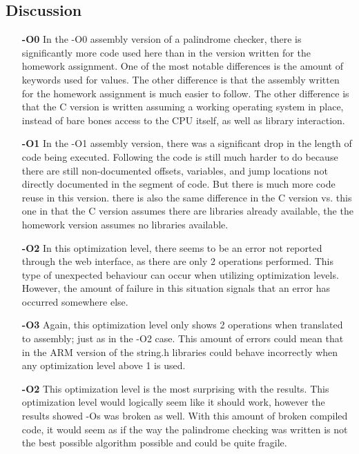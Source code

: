 \documentclass[letterpaper,10pt,titlepage]{article}
\begin{document}
\subsection*{Discussion}
\begin{enumerate}
\item[\textbf{-O0}]{}
In the -O0 assembly version of a palindrome checker, there is significantly more code used here than in the version written for the homework assignment. One of the most notable differences is the amount of keywords used for values. The other difference is that the assembly written for the homework assignment is much easier to follow. The other difference is that the C version is written assuming a working operating system in place, instead of bare bones access to the CPU itself, as well as library interaction.

\item[\textbf{-O1}]{}
In the -O1 assembly version, there was a significant drop in the length of code being executed. Following the code is still much harder to do because there are still non-documented offsets, variables, and jump locations not directly documented in the segment of code. But there is much more code reuse in this version. there is also the same difference in the C version vs. this one in that the C version assumes there are libraries already available, the the homework version assumes no libraries available.

\item[\textbf{-O2}]{}
In this optimization level, there seems to be an error not reported through the web interface, as there are only 2 operations performed. This type of unexpected behaviour can occur when utilizing optimization levels. However, the amount of failure in this situation signals that an error has occurred somewhere else.

\item[\textbf{-O3}]{}
Again, this optimization level only shows 2 operations when translated to assembly; just as in the -O2 case. This amount of errors could mean that in the ARM version of the string.h libraries could behave incorrectly when any optimization level above 1 is used.

\item[\textbf{-O2}]{}
This optimization level is the most surprising with the results. This optimization level would logically seem like it should work, however the results showed -Os was broken as well. With this amount of broken compiled code, it would seem as if the way the palindrome checking was written is not the best possible algorithm possible and could be quite fragile.
\end{enumerate}
\end{document}
